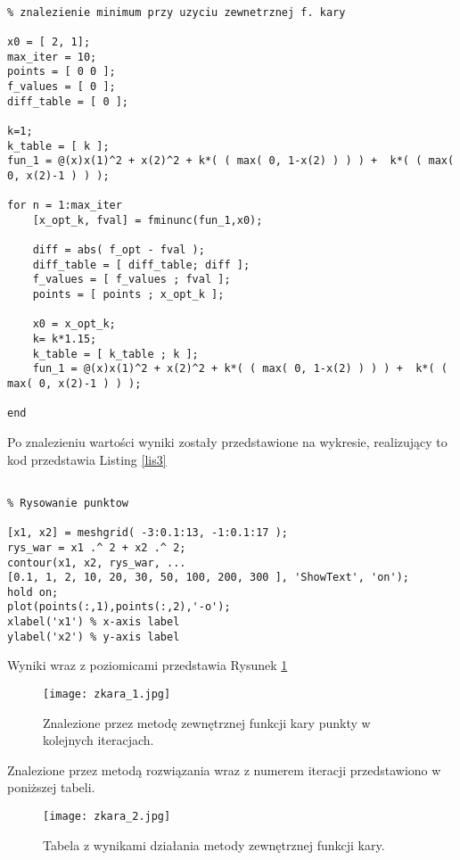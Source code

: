 \documentclass[a4paper,15pt]{article}
\begin{document}
\begin{lstlisting}[caption=Znalezienie minimum przy użyciu zewnętrznej funkcji kary ( fminunc ), captionpos=b,label=lis2, firstnumber=12,frame=single]

% znalezienie minimum przy uzyciu zewnetrznej f. kary

x0 = [ 2, 1]; 
max_iter = 10;
points = [ 0 0 ];
f_values = [ 0 ];
diff_table = [ 0 ];

k=1;
k_table = [ k ];
fun_1 = @(x)x(1)^2 + x(2)^2 + k*( ( max( 0, 1-x(2) ) ) ) +  k*( ( max( 0, x(2)-1 ) ) );

for n = 1:max_iter
    [x_opt_k, fval] = fminunc(fun_1,x0);
    
    diff = abs( f_opt - fval );
    diff_table = [ diff_table; diff ];
    f_values = [ f_values ; fval ];  
    points = [ points ; x_opt_k ];
    
    x0 = x_opt_k;
    k= k*1.15;
    k_table = [ k_table ; k ];
    fun_1 = @(x)x(1)^2 + x(2)^2 + k*( ( max( 0, 1-x(2) ) ) ) +  k*( ( max( 0, x(2)-1 ) ) );

end

\end{lstlisting}

Po znalezieniu wartości wyniki zostały przedstawione na wykresie, realizujący to kod przedstawia Listing \ref{lis3}
\begin{lstlisting}[caption=Stworzenie wykresu z wynikami, captionpos=b,label=lis3, firstnumber=12,frame=single]

% Rysowanie punktow 

[x1, x2] = meshgrid( -3:0.1:13, -1:0.1:17 ); 
rys_war = x1 .^ 2 + x2 .^ 2; 
contour(x1, x2, rys_war, ...
[0.1, 1, 2, 10, 20, 30, 50, 100, 200, 300 ], 'ShowText', 'on');
hold on; 
plot(points(:,1),points(:,2),'-o');
xlabel('x1') % x-axis label
ylabel('x2') % y-axis label

\end{lstlisting}

Wyniki wraz z poziomicami przedstawia Rysunek \ref{fig:zkara_1}
\begin{figure}[H]
\centerline{\texttt{[image: zkara\_1.jpg]}}
\centering
\caption{Znalezione przez metodę zewnętrznej funkcji kary punkty w kolejnych iteracjach.}
\label{fig:zkara_1}
\end{figure}

Znalezione przez metodą rozwiązania wraz z numerem iteracji przedstawiono w poniższej tabeli.  
\begin{figure}[H]
\centerline{\texttt{[image: zkara\_2.jpg]}}
\centering
\caption{Tabela z wynikami działania metody zewnętrznej funkcji kary.}
\label{fig:zkara_2}
\end{figure}
\end{document}
